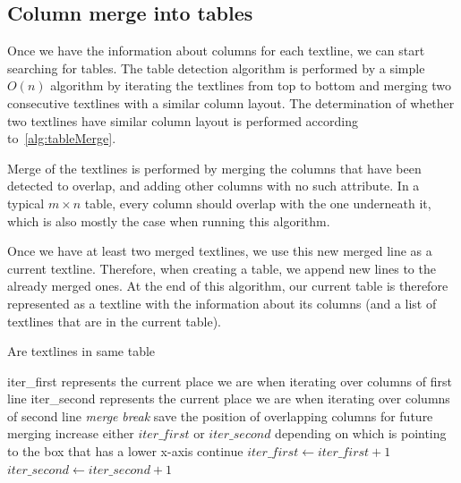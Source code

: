 \subsection{Column merge into tables}

Once we have the information about columns for each textline, we can start searching for tables. The table detection algorithm is performed by a simple $O(n)$ algorithm by iterating the textlines from top to bottom and merging two consecutive textlines with a similar column layout. The determination of whether two textlines have similar column layout is performed according to~\cref{alg:tableMerge}.

Merge of the textlines is performed by merging the columns that have been detected to overlap, and adding other columns with no such attribute. In a typical $m{\times}n$ table, every column should overlap with the one underneath it, which is also mostly the case when running this algorithm.

Once we have at least two merged textlines, we use this new merged line as a current textline. Therefore, when creating a table, we append new lines to the already merged ones. At the end of this algorithm, our current table is therefore represented as a textline with the information about its columns (and a list of textlines that are in the current table).


\begin{algorithm}[p]
\caption{Are textlines in same table}
{\scriptsize
\label{alg:tableMerge}
\begin{algorithmic}
\Require iter\_first \Comment represents the current place we are when iterating over columns of first line
\State iter\_second \Comment represents the current place we are when iterating over columns of second line
\State \emph{merge}
\EndIf
\State \emph{break}
\EndIf
{} 
\State save the position of overlapping columns for future merging
\EndIf
\Else 
\State increase either $iter\_first$ or $iter\_second$ depending on which is pointing to the box that has a lower x-axis
\State continue
\EndIf
\State $iter\_first \gets iter\_first+1$
\State $iter\_second \gets iter\_second+1$
\EndWhile
\end{algorithmic}}
\end{algorithm}

